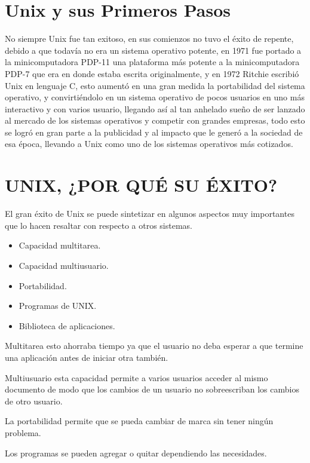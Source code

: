 \section*{Unix y sus Primeros Pasos}
No siempre Unix fue tan exitoso, en sus comienzos no tuvo el éxito de repente, debido a que todavía no era un sistema operativo potente, en 1971 fue portado a la 
minicomputadora PDP-11 una plataforma más potente a la minicomputadora PDP-7 que era en donde estaba escrita originalmente, y en 1972 Ritchie escribió Unix en lenguaje C, 
esto aumentó en una gran medida la portabilidad del sistema operativo, y convirtiéndolo en un sistema operativo de pocos usuarios en uno más interactivo y con varios 
usuario, llegando así al tan anhelado sueño de ser lanzado al mercado de los sistemas operativos y competir con grandes empresas, todo esto se logró en gran parte a la  
publicidad y al impacto que le generó a la sociedad de esa época, llevando a Unix como uno de los sistemas operativos más cotizados.



\section*{UNIX, ¿POR QUÉ SU ÉXITO?}
El gran éxito de Unix se puede sintetizar en algunos aspectos muy importantes que lo hacen resaltar con respecto a otros sistemas.

\begin{itemize}
	\item Capacidad multitarea.
	\item Capacidad multiusuario.
	\item Portabilidad.
	\item Programas de UNIX.
	\item Biblioteca de aplicaciones.
\end{itemize} 

Multitarea esto ahorraba tiempo ya que el usuario no deba esperar a que termine una aplicación antes de iniciar otra también.
 
Multiusuario esta capacidad permite a varios usuarios acceder al mismo documento de modo que los cambios de un usuario no sobreescriban los cambios de otro usuario.                                                                  

La portabilidad permite que se pueda cambiar de marca sin tener ningún problema.

Los programas se pueden agregar o quitar dependiendo las necesidades.

